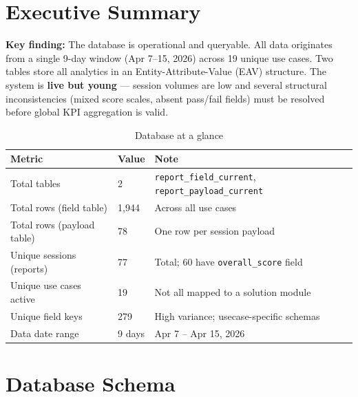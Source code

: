 \documentclass[12pt,a4paper]{article}
\begin{document}
\section{Executive Summary}

\begin{infobox}
\textbf{Key finding:} The database is operational and queryable.  All data
originates from a single 9-day window (Apr 7--15, 2026) across 19 unique use
cases.  Two tables store all analytics in an Entity-Attribute-Value (EAV)
structure.  The system is \textbf{live but young} --- session volumes are low
and several structural inconsistencies (mixed score scales, absent pass/fail
fields) must be resolved before global KPI aggregation is valid.
\end{infobox}

\vspace{0.5cm}

\begin{table}[H]
\centering\small
\begin{tabular}{L{6cm} R{2.5cm} L{5.5cm}}
\toprule
\textbf{Metric} & \textbf{Value} & \textbf{Note} \\
\midrule
Total tables                   & 2       & \texttt{report\_field\_current}, \texttt{report\_payload\_current} \\
Total rows (field table)        & 1{,}944 & Across all use cases \\
Total rows (payload table)      & 78      & One row per session payload \\
Unique sessions (reports)       & 77      & Total; 60 have \texttt{overall\_score} field \\
Unique use cases active         & 19      & Not all mapped to a solution module \\
Unique field keys               & 279     & High variance; usecase-specific schemas \\
Data date range                 & 9 days  & Apr 7 -- Apr 15, 2026 \\
\bottomrule
\end{tabular}
\caption{Database at a glance}
\end{table}

\section{Database Schema}
\end{document}
